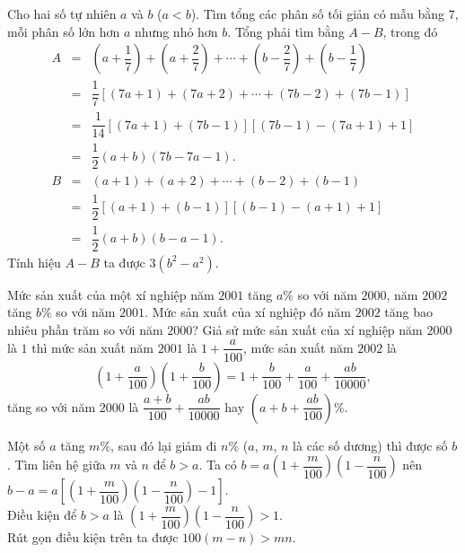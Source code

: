 \begin{bt}%
 Cho hai số tự nhiên $a$ và $b$ ($a<b$). Tìm tổng các phân số tối giản có mẫu bằng $7$, mỗi phân số lớn hơn $a$ nhưng nhỏ hơn $b$.
 \loigiai
  {
  Tổng phải tìm bằng $A-B$, trong đó
  \allowdisplaybreaks
  \begin{eqnarray*}
   A &=& \left(a+\dfrac{1}{7}\right) + \left(a+\dfrac{2}{7}\right) + \cdots + \left(b-\dfrac{2}{7}\right) + \left(b-\dfrac{1}{7}\right)\\
   &=& \dfrac{1}{7} \left[(7a+1)+(7a+2)+ \cdots +(7b-2)+(7b-1)\right]\\
   &=& \dfrac{1}{14} \left[(7a+1)+(7b-1)\right] \left[(7b-1)-(7a+1)+1\right]\\
   &=& \dfrac{1}{2}(a+b)(7b-7a-1).\\
   B &=& (a+1) + (a+2) + \cdots + (b-2) + (b-1)\\
   &=& \dfrac{1}{2} \left[(a+1)+(b-1)\right]\left[(b-1)-(a+1)+1\right]\\
   &=& \dfrac{1}{2}(a+b)(b-a-1).
  \end{eqnarray*}
  Tính hiệu $A-B$ ta được $3(b^2-a^2)$.
  }
\end{bt}

\begin{bt}%
 Mức sản xuất của một xí nghiệp năm $2001$ tăng $a \%$ so với năm $2000$, năm $2002$ tăng $b \%$ so với năm $2001$. Mức sản xuất của xí nghiệp đó năm $2002$ tăng bao nhiêu phần trăm so với năm $2000$?
 \loigiai
  {
  Giả sử mức sản xuất của xí nghiệp năm $2000$ là $1$ thì mức sản xuất năm $2001$ là $1+\dfrac{a}{100}$, mức sản xuất năm $2002$ là
  \[\left(1+\dfrac{a}{100}\right)\left(1+\dfrac{b}{100}\right) = 1+\dfrac{b}{100}+\dfrac{a}{100}+\dfrac{ab}{10000}, \]
  tăng so với năm $2000$ là $\dfrac{a+b}{100}+\dfrac{ab}{10000}$ hay $\left(a+b+\dfrac{ab}{100}\right)\%$.
  }
\end{bt}

\begin{bt}%
 Một số $a$ tăng $m \%$, sau đó lại giảm đi $n \%$ ($a$, $m$, $n$ là các số dương) thì được số $b$. Tìm liên hệ giữa $m$ và $n$ để $b>a$.
 \loigiai
  {
  Ta có $b=a\left(1+\dfrac{m}{100}\right)\left(1-\dfrac{n}{100}\right)$ nên $b-a = a\left[\left(1+\dfrac{m}{100}\right)\left(1-\dfrac{n}{100}\right)-1\right]$.\\
  Điều kiện để $b>a$ là $\left(1+\dfrac{m}{100}\right)\left(1-\dfrac{n}{100}\right) >1$.\\
  Rút gọn điều kiện trên ta được $100(m-n)>mn$.
  }
\end{bt}


